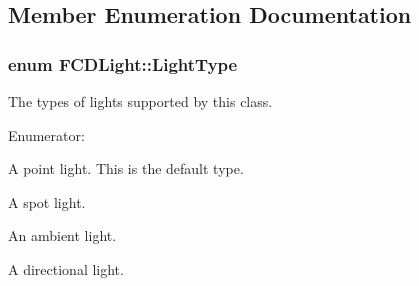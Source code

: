 \subsection{Member Enumeration Documentation}
\hypertarget{classFCDLight_a358eac688b4a74aa90531e5206e92e60}{
\subsubsection[{LightType}]{\setlength{\rightskip}{0pt plus 5cm}enum {\bf FCDLight::LightType}}}
\label{classFCDLight_a358eac688b4a74aa90531e5206e92e60}
The types of lights supported by this class. \begin{Desc}
\item[Enumerator: ]\par
\begin{description}
\item[{\em 
\hypertarget{classFCDLight_a358eac688b4a74aa90531e5206e92e60acdd1f5feac88cf971d9edad4126243c5}{
POINT}
\label{classFCDLight_a358eac688b4a74aa90531e5206e92e60acdd1f5feac88cf971d9edad4126243c5}
}]A point light. This is the default type. \item[{\em 
\hypertarget{classFCDLight_a358eac688b4a74aa90531e5206e92e60aaca948f926e7b39611a4f5a4886db8cd}{
SPOT}
\label{classFCDLight_a358eac688b4a74aa90531e5206e92e60aaca948f926e7b39611a4f5a4886db8cd}
}]A spot light. \item[{\em 
\hypertarget{classFCDLight_a358eac688b4a74aa90531e5206e92e60abf76b195d4f9db1832f491c0b6223c5e}{
AMBIENT}
\label{classFCDLight_a358eac688b4a74aa90531e5206e92e60abf76b195d4f9db1832f491c0b6223c5e}
}]An ambient light. \item[{\em 
\hypertarget{classFCDLight_a358eac688b4a74aa90531e5206e92e60a07c34b01d651ace906e59ff728a8112d}{
DIRECTIONAL}
\label{classFCDLight_a358eac688b4a74aa90531e5206e92e60a07c34b01d651ace906e59ff728a8112d}
}]A directional light. \end{description}
\end{Desc}



